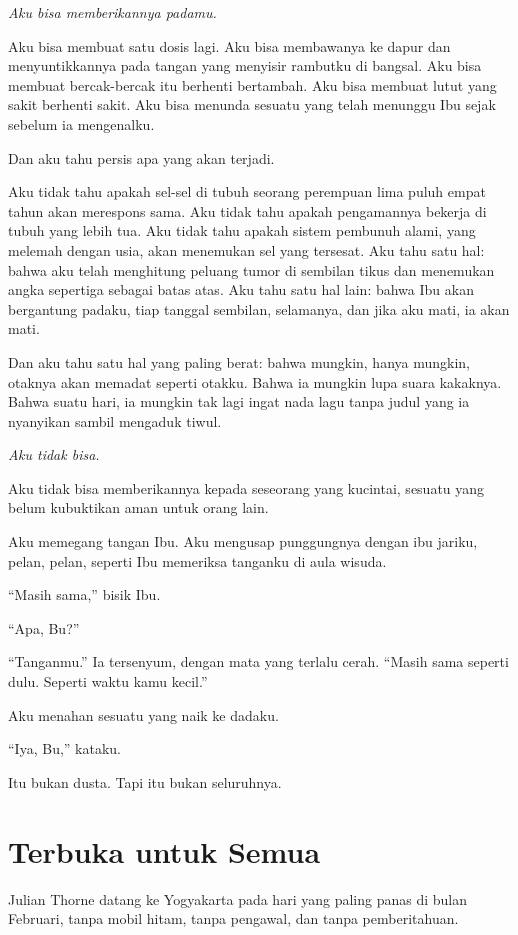 \documentclass[11pt,twoside,openany]{book}
\begin{document}
\emph{Aku bisa memberikannya padamu.}

Aku bisa membuat satu dosis lagi. Aku bisa membawanya ke dapur dan menyuntikkannya pada tangan yang menyisir rambutku di bangsal. Aku bisa membuat bercak-bercak itu berhenti bertambah. Aku bisa membuat lutut yang sakit berhenti sakit. Aku bisa menunda sesuatu yang telah menunggu Ibu sejak sebelum ia mengenalku.

Dan aku tahu persis apa yang akan terjadi.

Aku tidak tahu apakah sel-sel di tubuh seorang perempuan lima puluh empat tahun akan merespons sama. Aku tidak tahu apakah pengamannya bekerja di tubuh yang lebih tua. Aku tidak tahu apakah sistem pembunuh alami, yang melemah dengan usia, akan menemukan sel yang tersesat. Aku tahu satu hal: bahwa aku telah menghitung peluang tumor di sembilan tikus dan menemukan angka sepertiga sebagai batas atas. Aku tahu satu hal lain: bahwa Ibu akan bergantung padaku, tiap tanggal sembilan, selamanya, dan jika aku mati, ia akan mati.

Dan aku tahu satu hal yang paling berat: bahwa mungkin, hanya mungkin, otaknya akan memadat seperti otakku. Bahwa ia mungkin lupa suara kakaknya. Bahwa suatu hari, ia mungkin tak lagi ingat nada lagu tanpa judul yang ia nyanyikan sambil mengaduk tiwul.

\emph{Aku tidak bisa.}

Aku tidak bisa memberikannya kepada seseorang yang kucintai, sesuatu yang belum kubuktikan aman untuk orang lain.

Aku memegang tangan Ibu. Aku mengusap punggungnya dengan ibu jariku, pelan, pelan, seperti Ibu memeriksa tanganku di aula wisuda.

``Masih sama,'' bisik Ibu.

``Apa, Bu?''

``Tanganmu.'' Ia tersenyum, dengan mata yang terlalu cerah. ``Masih sama seperti dulu. Seperti waktu kamu kecil.''

Aku menahan sesuatu yang naik ke dadaku.

``Iya, Bu,'' kataku.

Itu bukan dusta. Tapi itu bukan seluruhnya.

\chapter{Terbuka untuk Semua}
Julian Thorne datang ke Yogyakarta pada hari yang paling panas di bulan Februari, tanpa mobil hitam, tanpa pengawal, dan tanpa pemberitahuan.
\end{document}
